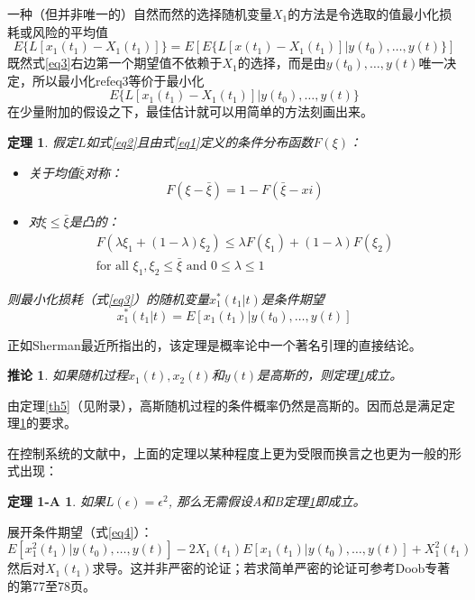 \documentclass[UTF8,adobefonts]{ctexart}
\newtheorem{theorem}{定理}
\newtheorem*{theorem1a}{定理 1-A}
\newtheorem*{corollary}{推论}
\begin{document}
一种（但并非唯一的）自然而然的选择随机变量$X_1$的方法是令选取的值最小化损耗或风险的平均值
\begin{equation}
\label{eq3}
E\{L[x_1(t_1)-X_1(t_1)]\}=E[E\{L[x(t_1)-X_1(t_1)] \vert y(t_0), \dotsc, y(t)\}]
\end{equation}
既然式\ref{eq3}右边第一个期望值不依赖于$X_1$的选择，而是由$y(t_0), \dotsc, y(t)$唯一决定，所以最小化ref{eq3}等价于最小化
\begin{equation}
\label{eq4}
E\{L[x_1(t_1)-X_1(t_1)] \vert y(t_0), \dotsc, y(t)\}
\end{equation}
在少量附加的假设之下，最佳估计就可以用简单的方法刻画出来。
\begin{theorem}
\label{th1}
假定$L$如式\ref{eq2}且由式\ref{eq1}定义的条件分布函数$F(\xi)$：
\begin{itemize}
\item[A] 关于均值$\bar{\xi}$对称：
    \begin{equation*}
    F(\xi-\bar{\xi})=1-F(\bar{\xi}-xi)
    \end{equation*}
\item[B] 对$\xi \le \bar{\xi}$是凸的：
    \begin{multline*}
    F(\lambda\xi_1+(1-\lambda)\xi_2) \le \lambda F(\xi_1)+(1-\lambda)F(\xi_2)\\
    \text{for all }\xi_1,\xi_2 \le \bar{\xi} \text{ and } 0 \le \lambda \le 1
    \end{multline*}
\end{itemize}
则最小化损耗（式\ref{eq3}）的随机变量$x^{\ast}_1(t_1 \vert t)$是条件期望
\begin{equation}
\label{eq5}
x^{\ast}_1(t_1 \vert t)=E[x_1(t_1) \vert y(t_0),\dotsc,y(t)]
\end{equation}
\end{theorem}
{}
正如Sherman最近所指出\cite{rf25}的，该定理是概率论中一个著名引理的直接结论。

\begin{corollary}
如果随机过程${x_1(t),x_2(t)}$和${y(t)}$是高斯的，则定理\ref{th1}成立。
\end{corollary}
{}
由定理\ref{th5}（见附录），高斯随机过程的条件概率仍然是高斯的。因而总是满足定理\ref{th1}的要求。

在控制系统的文献中，上面的定理以某种程度上更为受限而换言之也更为一般的形式出现：
\begin{theorem1a}
\label{th1a}
如果$L(\epsilon)=\epsilon^2$, 那么无需假设A和B定理\ref{th1}即成立。
\end{theorem1a}
{}
展开条件期望（式\ref{eq4}）：
\begin{equation*}
E[x_1^2(t_1) \vert y(t_0),\dotsc,y(t)]-2X_1(t_1)E[x_1(t_1) \vert y(t_0),\dotsc,y(t)]+X_1^2(t_1)
\end{equation*}
然后对$X_1(t_1)$求导。这并非严密的论证；若求简单严密的论证可参考Doob专著的第77至78页。
\end{document}
